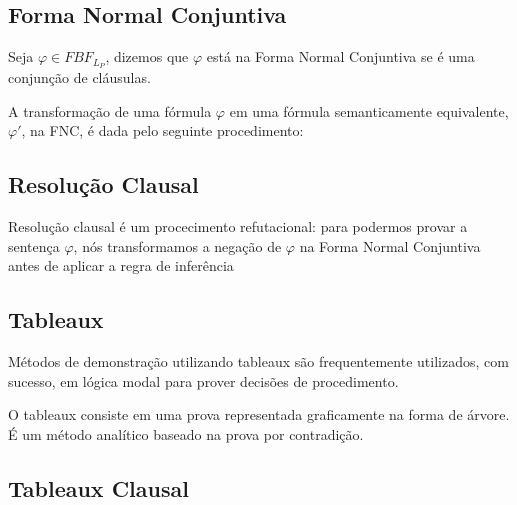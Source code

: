 \subsection{Forma Normal Conjuntiva}
\begin{definition}
    Seja $\varphi \in FBF_{L_P}$, dizemos que $\varphi$ está na Forma Normal
    Conjuntiva se é uma conjunção de cláusulas.
\end{definition}

A transformação de uma fórmula $\varphi$ em uma fórmula semanticamente
equivalente, $\varphi '$, na FNC, é dada pelo seguinte procedimento:




\subsection{Resolução Clausal}
Resolução clausal é um procecimento refutacional: para podermos provar a
sentença $\varphi$, nós transformamos a negação de $\varphi$ na Forma Normal
Conjuntiva antes de aplicar a regra de inferência

\subsection{Tableaux}
\label{sub:tableaux}
Métodos de demonstração utilizando tableaux são frequentemente utilizados,
com sucesso, em lógica modal para prover decisões de procedimento.

O tableaux consiste em uma prova representada graficamente na forma de árvore. É
um método analítico baseado na prova por contradição.


\subsection{Tableaux Clausal}



